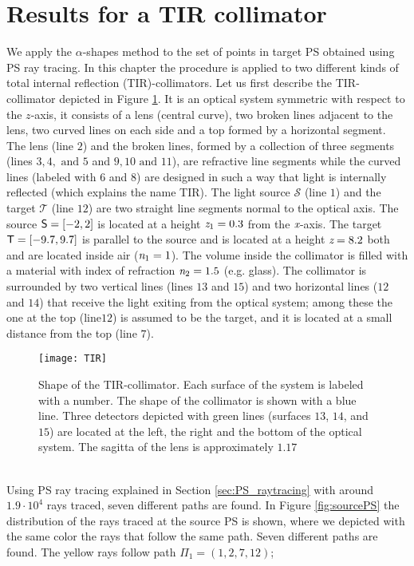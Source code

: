\section{Results for a TIR collimator}\label{results-Tir-alpha}
We apply the $\alpha$-shapes method to the set of points in target PS obtained using PS ray tracing.
In this chapter the procedure is applied to two different kinds of total internal reflection (TIR)-collimators. 
Let us first describe the TIR-collimator depicted in Figure \ref{fig:tir}. It is an optical system symmetric with respect to the $z$-axis, it consists of a lens (central curve), two broken lines adjacent to the lens,
two curved lines on each side and a top formed by a horizontal segment. The lens (line $2$) and the broken lines, formed by a collection of three segments (lines $3, 4, \mbox{ and } 5$ and $9, 10 \mbox{ and } 11$), are refractive line segments while the curved lines (labeled with $6$ and $8$) are designed in such a way that light is internally reflected (which explains the name TIR).
The light source $\mathcal{S}$ (line $1$) and the target $\mathcal{T}$ (line $12$) are two straight line segments normal to the optical axis.
The source $\textsf{S}= [-2,2]$ is located at a height $\textit{z}_{1} = 0.3$ from the $\textit{x}$-axis.
 The target $\textsf{T}= [-9.7, 9.7]$ is parallel to the source and is located at a height $ \textit{z}= 8.2$ both  and  are located inside air ($\textit{n}_1=1$).
The volume inside the collimator is filled with a material with index of refraction $\textit{n}_2=1.5$ (e.g. glass).
The collimator is surrounded by two vertical lines (lines $13$ and $15$) and two horizontal lines ($12$ and $14$) that receive the light exiting from the optical system; among these the one at the top (line$12$) is assumed to be the target, and it is located at a small distance from the top (line $7$). 
\begin{figure}[h]
  \begin{center}
  \texttt{[image: TIR]}
  \end{center}
  \caption{Shape of the TIR-collimator. Each surface of the system is labeled with a number.
   The shape of the collimator is shown with a blue line.
   Three detectors depicted with green lines (surfaces $13$, $14$, and $15$) are located at the left, the right and the bottom of the optical system.
The sagitta of the lens is approximately $1.17$}
  \label{fig:tir}
\end{figure}
\\ \indent
Using PS ray tracing explained in Section \ref{sec:PS_raytracing} with around $1.9 \cdot 10^4$ rays traced, seven different paths are found. In Figure \ref{fig:sourcePS} the distribution of the rays traced at the source PS  is shown, where we depicted with the same color the rays that follow the same path. Seven different paths are found. The yellow rays follow path $\Pi_1 = (1, 2, 7, 12)$;
